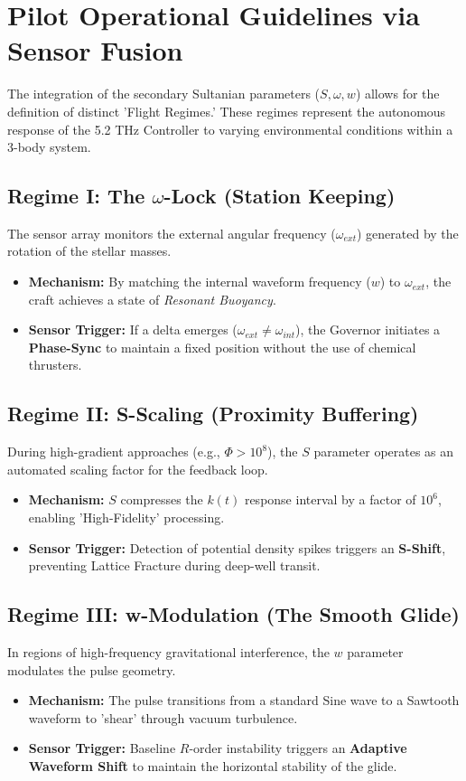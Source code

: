 \documentclass[11pt]{article}
\begin{document}
\section{Pilot Operational Guidelines via Sensor Fusion}

The integration of the secondary Sultanian parameters ($S, \omega, w$) allows for the definition of distinct 'Flight Regimes.' These regimes represent the autonomous response of the 5.2 THz Controller to varying environmental conditions within a 3-body system.

\subsection{Regime I: The $\omega$-Lock (Station Keeping)}
The sensor array monitors the external angular frequency ($\omega_{ext}$) generated by the rotation of the stellar masses. 
\begin{itemize}
    \item \textbf{Mechanism:} By matching the internal waveform frequency ($w$) to $\omega_{ext}$, the craft achieves a state of \textit{Resonant Buoyancy}.
    \item \textbf{Sensor Trigger:} If a delta emerges ($\omega_{ext} \neq \omega_{int}$), the Governor initiates a \textbf{Phase-Sync} to maintain a fixed position without the use of chemical thrusters.
\end{itemize}

\subsection{Regime II: S-Scaling (Proximity Buffering)}
During high-gradient approaches (e.g., $\Phi > 10^{8}$), the $S$ parameter operates as an automated scaling factor for the feedback loop.
\begin{itemize}
    \item \textbf{Mechanism:} $S$ compresses the $k(t)$ response interval by a factor of $10^{6}$, enabling 'High-Fidelity' processing.
    \item \textbf{Sensor Trigger:} Detection of potential density spikes triggers an \textbf{S-Shift}, preventing Lattice Fracture during deep-well transit.
\end{itemize}

\subsection{Regime III: w-Modulation (The Smooth Glide)}
In regions of high-frequency gravitational interference, the $w$ parameter modulates the pulse geometry.
\begin{itemize}
    \item \textbf{Mechanism:} The pulse transitions from a standard Sine wave to a Sawtooth waveform to 'shear' through vacuum turbulence.
    \item \textbf{Sensor Trigger:} Baseline $R$-order instability triggers an \textbf{Adaptive Waveform Shift} to maintain the horizontal stability of the glide.
\end{itemize}
\end{document}

